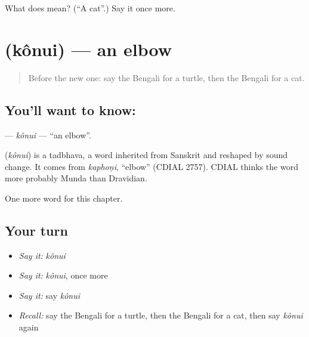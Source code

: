 \begin{tcolorbox}[breakable,colback=teal!4,colframe=teal!35!black,title={Before you move on}]
What does  mean? (\textquotedblleft{}A cat\textquotedblright{}.) Say it once more.
\end{tcolorbox}
\section[\texorpdfstring{\bn{কনুই} (kônui)}{কনুই (kônui)}]{ (kônui) — an elbow}

\label{lesson:BN-C123-konui}



\begin{quote}
Before the new one: say the Bengali for a turtle, then the Bengali for a cat.
\end{quote}

\subsection*{You'll want to know: }
\textbf{} — \emph{kônui} — \textquotedblleft{}an elbow\textquotedblright{}.

\begin{cousinweb}
\textbf{} (\emph{kônui}) is a tadbhava, a word inherited from Sanskrit and reshaped by sound change. It comes from \emph{kaphoṇi}, \textquotedblleft{}elbow\textquotedblright{} (CDIAL 2757). CDIAL thinks the word more probably Munda than Dravidian.
\end{cousinweb}

\begin{grammarlens}[title={What you've built}]
One more word for this chapter.
\end{grammarlens}

\subsection*{Your turn}
\begin{itemize}
\raggedright
  \item \emph{Say it:} \emph{kônui}
  \item \emph{Say it:} \emph{kônui}, once more
  \item \emph{Say it:} say \emph{kônui}
  \item \emph{Recall:} say the Bengali for a turtle, then the Bengali for a cat, then say \emph{kônui} again
\end{itemize}

